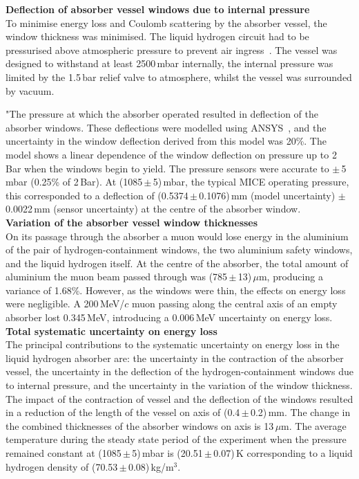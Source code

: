 \noindent\textbf{Deflection of absorber vessel windows due to internal
  pressure} \\
\noindent
To minimise energy loss and Coulomb scattering by the absorber vessel,
the window thickness was minimised.
The liquid hydrogen circuit had to be pressurised
above atmospheric pressure to prevent air ingress~\cite{1748-0221-13-09-T09008,Ishimoto}. 
The vessel was designed to withstand at least 2500\,mbar internally, the internal pressure was limited by the 1.5\,bar relief valve to atmosphere, whilst the vessel was surrounded by vacuum.

"The pressure at which the absorber operated resulted in deflection of the absorber windows. These
deflections were modelled using ANSYS~\cite{NOTE155}, and the uncertainty in the
window deflection derived from this model was 20\%.
The model shows a linear dependence of the window deflection on
pressure up to 2\,Bar when the windows begin to yield.
The pressure sensors were accurate to $\mathrm{\pm}$\,5\,mbar
(0.25\% of 2\,Bar).
At (1085\,$\mathrm{\pm}$\,5)\,mbar, the typical MICE operating
pressure, this corresponded to a deflection of
(0.5374\,$\mathrm{\pm}$\,0.1076)\,mm (model uncertainty)
$\mathrm{\pm}$\,0.0022\,mm (sensor uncertainty) at the centre of the
absorber window. \\

\noindent\textbf{Variation of the absorber vessel window thicknesses} \\
\noindent
On its passage through the absorber a muon would lose energy in the
aluminium of the pair of hydrogen-containment windows, the two
aluminium safety windows, and the liquid hydrogen itself.
At the centre of the absorber, the total amount of aluminium the muon
beam passed through was (785\,$\mathrm{\pm}$\,13)\,$\mu$m, producing a variance
of 1.68\%.
However, as the windows were thin, the effects on energy loss were
negligible.
A 200\,MeV/$c$ muon passing along the central axis of an empty
absorber lost 0.345\,MeV, introducing a 0.006\,MeV uncertainty
on energy loss.  \\

\noindent\textbf{Total systematic uncertainty on energy loss} \\
\noindent
The principal contributions to the systematic uncertainty on energy
loss in the liquid hydrogen absorber are: the uncertainty in the
contraction of the absorber vessel, the uncertainty in the deflection
of the hydrogen-containment windows due to internal pressure, and the
uncertainty in the variation of the window thickness.
The impact of the contraction of vessel and the deflection of the
windows resulted in a reduction of the length of the vessel on
axis of (0.4\,$\mathrm{\pm}$\,0.2)\,mm.
The change in the combined thicknesses of the absorber
windows on axis is 13\,$\mu$m.
The average temperature during the steady state period of the
experiment when the pressure remained constant at
(1085\,$\mathrm{\pm}$\,5)\,mbar is (20.51\,$\mathrm{\pm}$\,0.07)\,K 
corresponding to a liquid hydrogen density of (70.53\,$\mathrm{\pm}$\,0.08)\,kg/m$^{3}$.

